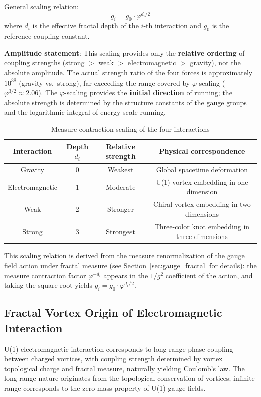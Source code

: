 \documentclass[12pt,a4paper,twocolumn]{article}
\renewcommand{\phi}{\varphi}
\begin{document}
General scaling relation:
\[
g_i = g_0 \cdot \phi^{d_i/2}
\]
where $d_i$ is the effective fractal depth of the $i$-th interaction and $g_0$ is the reference coupling constant.

\textbf{Amplitude statement}: This scaling provides only the \textbf{relative ordering} of coupling strengths (strong $>$ weak $>$ electromagnetic $>$ gravity), not the absolute amplitude. The actual strength ratio of the four forces is approximately $10^{38}$ (gravity vs.\ strong), far exceeding the range covered by $\phi$-scaling ($\phi^{3/2}\approx 2.06$). The $\phi$-scaling provides the \textbf{initial direction} of running; the absolute strength is determined by the structure constants of the gauge groups and the logarithmic integral of energy-scale running.

\begin{table}[H]
\centering
\footnotesize
\caption{Measure contraction scaling of the four interactions}
\begin{tabular}{c|c|c|c}
\hline
\textbf{Interaction} & \textbf{Depth} $d_i$ & \textbf{Relative strength} & \textbf{Physical correspondence} \\
\hline
Gravity & 0 & Weakest & Global spacetime deformation \\
Electromagnetic & 1 & Moderate & U(1) vortex embedding in one dimension \\
Weak & 2 & Stronger & Chiral vortex embedding in two dimensions \\
Strong & 3 & Strongest & Three-color knot embedding in three dimensions \\
\hline
\end{tabular}
\end{table}

This scaling relation is derived from the measure renormalization of the gauge field action under fractal measure (see Section~\ref{sec:gauge_fractal} for details): the measure contraction factor $\phi^{-d_i}$ appears in the $1/g^2$ coefficient of the action, and taking the square root yields $g_i = g_0 \cdot \phi^{d_i/2}$.

\subsection{Fractal Vortex Origin of Electromagnetic Interaction}
U(1) electromagnetic interaction corresponds to long-range phase coupling between charged vortices, with coupling strength determined by vortex topological charge and fractal measure, naturally yielding Coulomb's law. The long-range nature originates from the topological conservation of vortices; infinite range corresponds to the zero-mass property of U(1) gauge fields.
\end{document}
